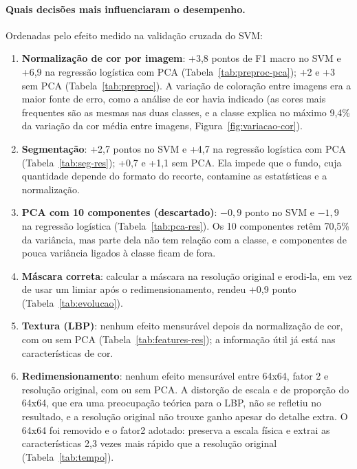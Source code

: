 \documentclass[11pt,a4paper]{article}
\begin{document}
\paragraph{Quais decisões mais influenciaram o desempenho.} Ordenadas pelo efeito medido na validação
cruzada do SVM:
\begin{enumerate}
  \item \textbf{Normalização de cor por imagem}: +3,8 pontos de F1 macro no SVM e +6,9 na regressão
        logística com PCA (Tabela~\ref{tab:preproc-pca}); +2 e +3 sem PCA (Tabela~\ref{tab:preproc}).
        A variação de coloração entre imagens era a maior fonte de erro, como a análise de cor havia
        indicado (as cores mais frequentes são as mesmas nas duas classes, e a classe explica no
        máximo 9,4\% da variação da cor média entre imagens, Figura~\ref{fig:variacao-cor}).
  \item \textbf{Segmentação}: +2,7 pontos no SVM e +4,7 na regressão logística com PCA
        (Tabela~\ref{tab:seg-res}); +0,7 e +1,1 sem PCA. Ela impede que o fundo, cuja quantidade
        depende do formato do recorte, contamine as estatísticas e a normalização.
  \item \textbf{PCA com 10 componentes (descartado)}: $-0{,}9$ ponto no SVM e $-1{,}9$ na regressão
        logística (Tabela~\ref{tab:pca-res}). Os 10 componentes retêm 70,5\% da variância, mas parte
        dela não tem relação com a classe, e componentes de pouca variância ligados à classe ficam de
        fora.
  \item \textbf{Máscara correta}: calcular a máscara na resolução original e erodi-la, em vez de usar
        um limiar após o redimensionamento, rendeu +0,9 ponto (Tabela~\ref{tab:evolucao}).
  \item \textbf{Textura (LBP)}: nenhum efeito mensurável depois da normalização de cor, com ou sem
        PCA (Tabela~\ref{tab:features-res}); a informação útil já está nas características de cor.
  \item \textbf{Redimensionamento}: nenhum efeito mensurável entre 64x64, fator 2 e resolução original,
        com ou sem PCA. A distorção de escala e de proporção do 64x64, que era uma preocupação teórica
        para o LBP, não se refletiu no resultado, e a resolução original não trouxe ganho apesar do
        detalhe extra. O 64x64 foi removido e o fator2 adotado: preserva a escala física e extrai as
        características 2,3 vezes mais rápido que a resolução original (Tabela~\ref{tab:tempo}).
\end{enumerate}
\end{document}
